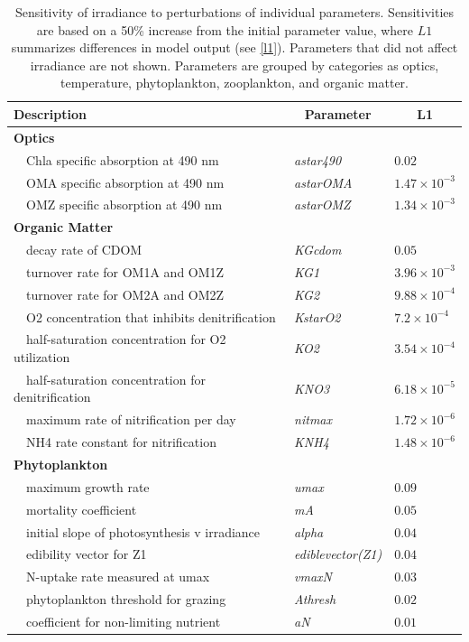 \documentclass[review]{elsarticle}\usepackage[]{graphicx}\usepackage[]{color}
\begin{document}
\begin{table}[!tbp]
{\footnotesize
\caption{Sensitivity of irradiance to perturbations of individual parameters.  Sensitivities are based on a 50\% increase from the initial parameter value, where $L1$ summarizes differences in model output (see \cref{l1}).  Parameters that did not affect irradiance are not shown.  Parameters are grouped by categories as optics, temperature, phytoplankton, zooplankton, and organic matter.\label{tab:irrsens}} 
\begin{center}
\begin{tabular}{lll}
\hline\hline
\multicolumn{1}{l}{Description}&\multicolumn{1}{c}{Parameter}&\multicolumn{1}{c}{L1}\tabularnewline
\hline
{\bfseries Optics}&&\tabularnewline
~~Chla specific absorption at 490 nm&\textit{astar490}&$0.02$\tabularnewline
~~OMA specific absorption at 490 nm&\textit{astarOMA}&$1.47\times 10^{-3}$\tabularnewline
~~OMZ specific absorption at 490 nm&\textit{astarOMZ}&$1.34\times 10^{-3}$\tabularnewline
\hline
{\bfseries Organic Matter}&&\tabularnewline
~~decay rate of CDOM&\textit{KGcdom}&$0.05$\tabularnewline
~~turnover rate for OM1A and OM1Z&\textit{KG1}&$3.96\times 10^{-3}$\tabularnewline
~~turnover rate for OM2A and OM2Z&\textit{KG2}&$9.88\times 10^{-4}$\tabularnewline
~~O2 concentration that inhibits denitrification&\textit{KstarO2}&$7.2\times 10^{-4}$\tabularnewline
~~half-saturation concentration for O2 utilization&\textit{KO2}&$3.54\times 10^{-4}$\tabularnewline
~~half-saturation concentration for denitrification&\textit{KNO3}&$6.18\times 10^{-5}$\tabularnewline
~~maximum rate of nitrification per day&\textit{nitmax}&$1.72\times 10^{-6}$\tabularnewline
~~NH4 rate constant for nitrification&\textit{KNH4}&$1.48\times 10^{-6}$\tabularnewline
\hline
{\bfseries Phytoplankton}&&\tabularnewline
~~maximum growth rate&\textit{umax}&$0.09$\tabularnewline
~~mortality coefficient&\textit{mA}&$0.05$\tabularnewline
~~initial slope of photosynthesis v irradiance&\textit{alpha}&$0.04$\tabularnewline
~~edibility vector for Z1&\textit{ediblevector(Z1)}&$0.04$\tabularnewline
~~N-uptake rate measured at umax&\textit{vmaxN}&$0.03$\tabularnewline
~~phytoplankton threshold for grazing&\textit{Athresh}&$0.02$\tabularnewline
~~coefficient for non-limiting nutrient&\textit{aN}&$0.01$\tabularnewline

\end{tabular}
\end{center}}
\end{table}
\end{document}
